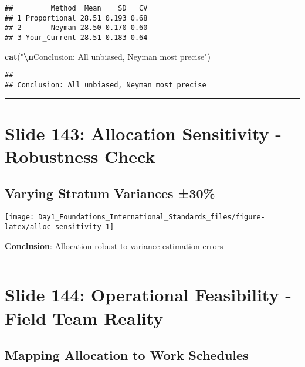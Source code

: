 \documentclass[
]{article}
\newenvironment{Shaded}{\begin{snugshade}}{\end{snugshade}}
\newcommand{\FunctionTok}[1]{\textcolor[rgb]{0.13,0.29,0.53}{\textbf{#1}}}
\newcommand{\NormalTok}[1]{#1}
\newcommand{\SpecialCharTok}[1]{\textcolor[rgb]{0.81,0.36,0.00}{\textbf{#1}}}
\newcommand{\StringTok}[1]{\textcolor[rgb]{0.31,0.60,0.02}{#1}}
\begin{document}
\begin{verbatim}
##         Method  Mean    SD   CV
## 1 Proportional 28.51 0.193 0.68
## 2       Neyman 28.50 0.170 0.60
## 3 Your_Current 28.51 0.183 0.64
\end{verbatim}

\begin{Shaded}
\begin{Highlighting}[]
\FunctionTok{cat}\NormalTok{(}\StringTok{"}\SpecialCharTok{\textbackslash{}n}\StringTok{Conclusion: All unbiased, Neyman most precise"}\NormalTok{)}
\end{Highlighting}
\end{Shaded}

\begin{verbatim}
## 
## Conclusion: All unbiased, Neyman most precise
\end{verbatim}

\begin{center}\rule{0.5\linewidth}{0.5pt}\end{center}

\section{Slide 143: Allocation Sensitivity - Robustness
Check}\label{slide-143-allocation-sensitivity---robustness-check}

\subsection{Varying Stratum Variances
±30\%}\label{varying-stratum-variances-30}

\texttt{[image: Day1\_Foundations\_International\_Standards\_files/figure-latex/alloc-sensitivity-1]}

\textbf{Conclusion}: Allocation robust to variance estimation errors

\begin{center}\rule{0.5\linewidth}{0.5pt}\end{center}

\section{Slide 144: Operational Feasibility - Field Team
Reality}\label{slide-144-operational-feasibility---field-team-reality}

\subsection{Mapping Allocation to Work
Schedules}\label{mapping-allocation-to-work-schedules}
\end{document}
